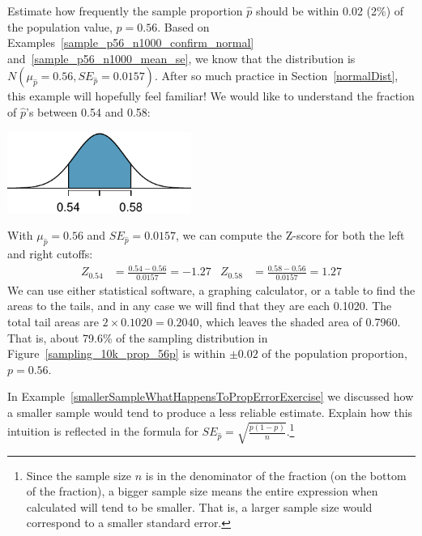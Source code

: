 \begin{example}{Estimate how frequently the sample proportion
$\hat{p}$ should be within 0.02 (2\%) of the population value,
$p = 0.56$. Based on Examples~\ref{sample_p56_n1000_confirm_normal}
and~\ref{sample_p56_n1000_mean_se}, we know that the distribution
is $N(\mu_{\hat{p}} = 0.56, SE_{\hat{p}} = 0.0157)$.}
\label{sampling_10k_prop_56p-prop_from_53_to_59}
After so much practice in Section~\ref{normalDist},
this example will hopefully feel familiar!
We would like to understand the fraction of $\hat{p}$'s
between 0.54 and 0.58:
\begin{center}
\includegraphics[width=60mm]{ch_inference_for_props/figures/p-hat_from_54_and_58/p-hat_from_54_and_58}
\end{center}
With $\mu_{\hat{p}} = 0.56$ and $SE_{\hat{p}} = 0.0157$,
we can compute the Z-score for both the left and right cutoffs:
\begin{align*}
Z_{0.54} &= \frac{0.54 - 0.56}{0.0157} = -1.27
&Z_{0.58} &= \frac{0.58 - 0.56}{0.0157} = 1.27
\end{align*}
We can use either statistical software, a graphing calculator,
or a table to find the areas to the tails, and in any case we
will find that they are each 0.1020. The total tail areas are
$2 \times 0.1020 = 0.2040$, which leaves the shaded area of
0.7960. That is, about 79.6\% of the sampling distribution
in Figure~\ref{sampling_10k_prop_56p} is within $\pm0.02$
of the population proportion, $p = 0.56$.
\end{example}

\begin{exercise}
In Example~\ref{smallerSampleWhatHappensToPropErrorExercise}
we discussed how a smaller sample would tend
to produce a less reliable estimate. Explain how this intuition
is reflected in the formula for
$SE_{\hat{p}} = \sqrt{\frac{p (1 - p)}{n}}$.\footnote{Since the
sample size $n$ is in the denominator of the fraction (on the
bottom of the fraction), a bigger sample size means the entire
expression when calculated will tend to be smaller. That is,
a larger sample size would correspond to a smaller standard error.}
\end{exercise}

